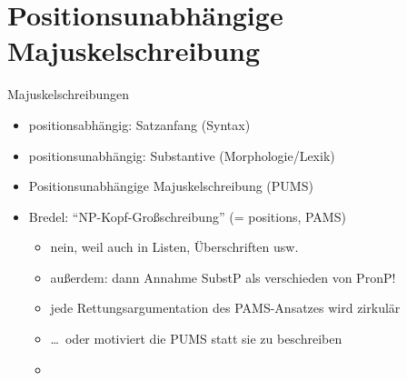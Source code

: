 \section[PUMS vs.\ PAMS]{Positionsunabhängige Majuskelschreibung}

\begin{frame}
  {Majuskelschreibungen}
  \pause
  \begin{itemize}[<+->]
    \item \alert{positionsabhängig}: Satzanfang (Syntax)
      \Halbzeile
    \item \alert{positionsunabhängig}: Substantive (Morphologie\slash Lexik)
    \item Positionsunabhängige Majuskelschreibung (PUMS)
      \Halbzeile
    \item Bredel: "`NP-Kopf-Großschreibung"' (= positions, PAMS)
      \begin{itemize}[<+->]
        \item nein, weil auch in Listen, Überschriften usw.
        \item außerdem: dann Annahme SubstP als verschieden von PronP!\\
        \item jede Rettungsargumentation des PAMS-Ansatzes wird zirkulär 
        \item \ldots\ oder \alert{motiviert} die PUMS statt sie zu beschreiben
        \item {}
      \end{itemize}
  \end{itemize}
\end{frame}


